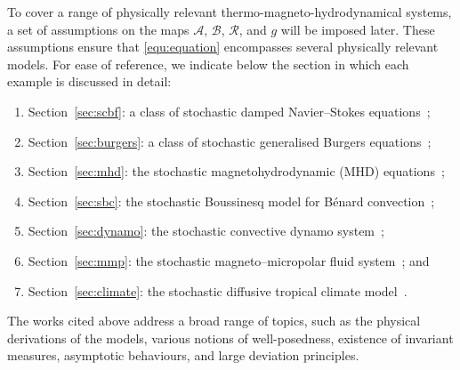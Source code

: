 \documentclass[11pt, reqno]{amsart}
\theoremstyle{definition}
\numberwithin{equation}{section}
\begin{document}
To cover a range of physically relevant thermo-magneto-hydrodynamical systems, a set of assumptions on the maps $\mathcal{A}$, $\mathcal{B}$, $\mathcal{R}$, and $g$ will be imposed later. These assumptions ensure that \eqref{equ:equation} encompasses several physically relevant models.
For ease of reference, we indicate below the section in which each example is discussed in detail:
\begin{enumerate}
\item Section~\ref{sec:scbf}: a class of stochastic damped Navier--Stokes equations~\cite{BrzFer19, CaiJiu08, GaoLiu19b, HajRob17, LiKim24};
\item Section~\ref{sec:burgers}: a class of stochastic generalised Burgers equations~\cite{BrzGolNek14, DaGat95, DonGuoWuZho23, DonWuZho24, Kim06};
\item Section~\ref{sec:mhd}: the stochastic magnetohydrodynamic (MHD) equations~\cite{Mot22, SerTem83, SriSun99, TitTra19, Yam16};
\item Section~\ref{sec:sbc}: the stochastic Boussinesq model for B\'enard convection~\cite{ChuMil10, DuaMil09, TitTra24, Yam16};
\item Section~\ref{sec:dynamo}: the stochastic convective dynamo system~\cite{CatEmoWei03, CatHug06, Tob21};
\item Section~\ref{sec:mmp}: the stochastic magneto–micropolar fluid system~\cite{InoMatOta03, KalLanLuk19, XuQiaZha21, Yam14, Yam16m}; and
\item Section~\ref{sec:climate}: the stochastic diffusive tropical climate model~\cite{FriMajPau04, LiTi16, Ye17, YinYan23}.
\end{enumerate}
The works cited above address a broad range of topics, such as the physical derivations of the models, various notions of well-posedness, existence of invariant measures, asymptotic behaviours, and large deviation principles. 
\end{document}
